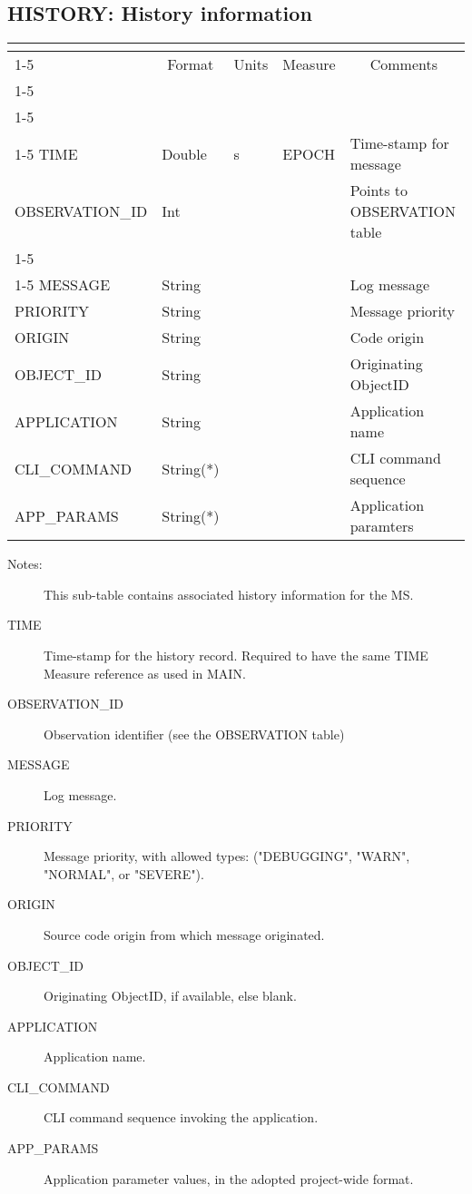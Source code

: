 \documentclass{article}
\newcommand{\defline}[1]{\cline{1-5}
\multicolumn{5}{|l|}{#1} \\
\cline{1-5}}
\newcommand{\definetable}[3][]
{
  \vfill\newpage
  \subsection{#2}
  \label{tbl:#1}
  \vspace{0.15in}
  \small
  \begin{tabular}{|l|p{1.25in}|l|p{.9in}|p{1.4in}|}
  \hline
  \multicolumn{5}{|c|}{\bf #1}\\
  \cline{1-5}
  \multicolumn{1}{|c|}{Name}&\multicolumn{1}{|c|}{Format}&
  \multicolumn{1}{|c|}{Units}&\multicolumn{1}{|c|}{Measure}&
  \multicolumn{1}{|c|}{Comments}\\
  \cline{1-5}
  #3
  \hline
  \end{tabular}
}
\begin{document}
\definetable{HISTORY: History information}{
\defline{\bf Columns}
\defline{\em Key}
TIME & Double & s &              EPOCH  & Time-stamp for message\\
OBSERVATION\_ID  & Int   &          &        & Points to OBSERVATION table\\
\defline{\em Data}
MESSAGE  & String &    &      & Log message\\
PRIORITY & String & & & Message priority\\
ORIGIN   & String & & & Code origin\\
OBJECT\_ID & String & & & Originating ObjectID \\
APPLICATION & String & & & Application name\\
CLI\_COMMAND & String(*) & & & CLI command sequence \\
APP\_PARAMS   & String(*) & & & Application paramters\\
}
\begin{description}

\item[Notes:] This sub-table contains associated history information
for the MS.

\item[TIME] Time-stamp for the history record. Required to have the
same TIME Measure reference as used in MAIN.

\item[OBSERVATION\_ID] Observation identifier (see the OBSERVATION table)

\item[MESSAGE] Log message.

\item[PRIORITY] Message priority, with allowed types: ("DEBUGGING",
"WARN", "NORMAL", or "SEVERE").

\item[ORIGIN] Source code origin from which message originated.

\item[OBJECT\_ID] Originating ObjectID, if available, else blank.

\item[APPLICATION] Application name.

\item[CLI\_COMMAND] CLI command sequence invoking the application.

\item[APP\_PARAMS] Application parameter values, in the adopted
project-wide format.
\end{description}
\end{document}
